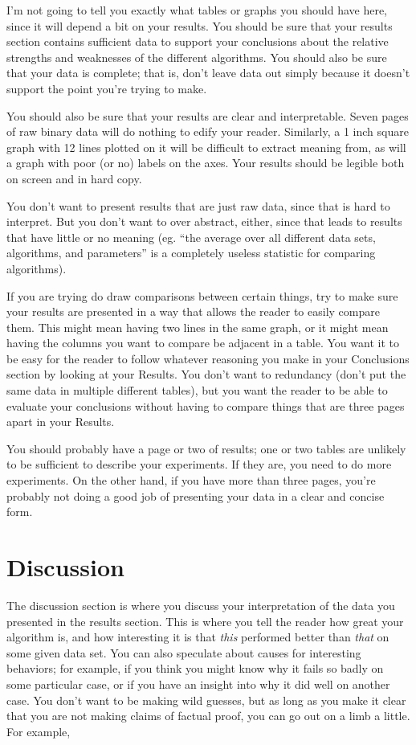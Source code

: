 \documentclass[12pt, letterpaper]{article}
\begin{document}
I'm not going to tell you exactly what tables or graphs you should have here,
since it will depend a bit on your results.  You should be sure that your
results section contains sufficient data to support your conclusions about the
relative strengths and weaknesses of the different algorithms.  You should also
be sure that your data is complete; that is, don't leave data out simply because
it doesn't support the point you're trying to make.

You should also be sure that your results are clear and interpretable.  Seven
pages of raw binary data will do nothing to edify your reader.  Similarly, a
1 inch square graph with 12 lines plotted on it will be difficult to extract
meaning from, as will a graph with poor (or no) labels on the axes.  Your
results should be legible both on screen and in hard copy.

You don't want to present results that are just raw data, since that is hard to
interpret.  But you don't want to over abstract, either, since that leads to
results that have little or no meaning (eg. ``the average over all different
data sets, algorithms, and parameters'' is a completely useless statistic for
comparing algorithms).

If you are trying do draw comparisons between certain things, try to make sure
your results are presented in a way that allows the reader to easily compare
them.  This might mean having two lines in the same graph, or it might mean
having the columns you want to compare be adjacent in a table.  You want it to
be easy for the reader to follow whatever reasoning you make in your Conclusions
section by looking at your Results.  You don't want to redundancy (don't put the
same data in multiple different tables), but you want the reader to be able to
evaluate your conclusions without having to compare things that are three pages
apart in your Results.

You should probably have a page or two of results; one or two tables are unlikely to be
sufficient to describe your experiments.  If they are, you need to do more
experiments.  On the other hand, if you have more than three pages, you're
probably not doing a good job of presenting your data in a clear and concise
form.

\section{Discussion}
The discussion section is where you discuss your interpretation of the data you
presented in the results section.  This is where you tell the reader how great
your algorithm is, and how interesting it is that \emph{this} performed better
than \emph{that} on some given data set.  You can also speculate about causes
for interesting behaviors; for example, if you think you might know why it fails
so badly on some particular case, or if you have an insight into why it did well
on another case.  You don't want to be making wild guesses, but as long as you
make it clear that you are not making claims of factual proof, you can go out on
a limb a little.  For example,
\end{document}
